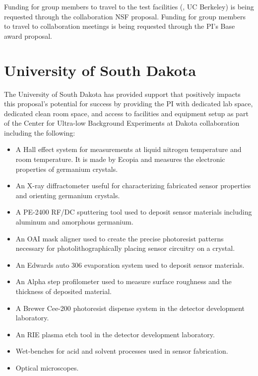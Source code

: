 

Funding for group members to travel to the test facilities (\SLAC, UC Berkeley) is being requested through the collaboration NSF  \SuperCDMS \RnD  proposal. Funding for group members to travel to collaboration meetings is being requested through the PI's Base award proposal.



\section{University of South Dakota}

The University of South Dakota has provided support that positively impacts this proposal's potential for success by providing the PI with dedicated lab space, dedicated clean room space, and access to facilities and equipment setup as part of the Center for Ultra-low Background Experiments at Dakota collaboration including the following:

\begin{itemize}
\item
A Hall effect system for measurements at liquid nitrogen temperature and room temperature. It is made by Ecopia and measures the electronic properties of germanium crystals.
\item
An X-ray diffractometer useful for characterizing fabricated sensor properties and orienting germanium crystals.
\item
A PE-2400 RF/DC sputtering tool used to deposit sensor materials including aluminum and amorphous germanium.
\item
An OAI mask aligner used to create the precise photoresist patterns necessary for photolithographically placing sensor circuitry on a crystal.
\item
An Edwards auto 306 evaporation system used to deposit sensor materials.
\item
An Alpha step profilometer used to measure surface roughness and the thickness of deposited material.
\item
A Brewer Cee-200 photoresist dispense system in the detector development laboratory. 
\item
An RIE plasma etch tool in the detector development laboratory. 
\item
Wet-benches for acid and solvent processes used in sensor fabrication.
\item
Optical microscopes.
\end{itemize}

